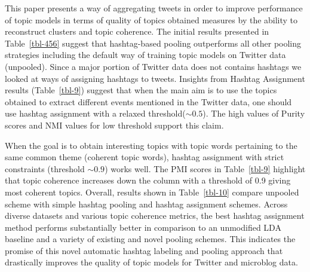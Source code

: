 \documentclass{sig-alternate}
\begin{document}
This paper 
presents a way of aggregating tweets
in order to improve performance of topic models in terms of quality of
topics obtained measures by the ability to reconstruct clusters and
topic coherence. The initial results presented in Table~\ref{tbl-456}
suggest that hashtag-based pooling outperforms all other pooling
strategies including the default way of training topic models on
Twitter data (unpooled). Since a major portion of Twitter data does not contains hashtags we looked at ways of assigning hashtags to tweets. Insights from Hashtag
Assignment results (Table~\ref{tbl-9}) suggest that when the main aim
is to use the topics obtained to extract different events mentioned in
the Twitter data, one should use hashtag assignment with a relaxed
threshold($\sim0.5$). The high values of Purity scores and NMI values for
low threshold support this claim.

When the goal is to obtain interesting topics with topic words
pertaining to the same common theme (coherent topic words), hashtag
assignment with strict constraints (threshold $\sim 0.9$) works
well. The PMI scores in Table~\ref{tbl-9} highlight that topic
coherence increases down the column with a threshold of
0.9 giving most coherent topics. Overall, results shown in Table~\ref{tbl-10} compare unpooled scheme with simple hashtag pooling and hashtag assignment schemes. Across diverse datasets and various topic coherence metrics, the best
hashtag assignment method performs substantially better in comparison
to an unmodified LDA baseline and a variety of existing and novel
pooling schemes.  This indicates the promise of this novel automatic
hashtag labeling and pooling approach that drastically improves the
quality of topic models for Twitter and microblog data.


\end{document}
